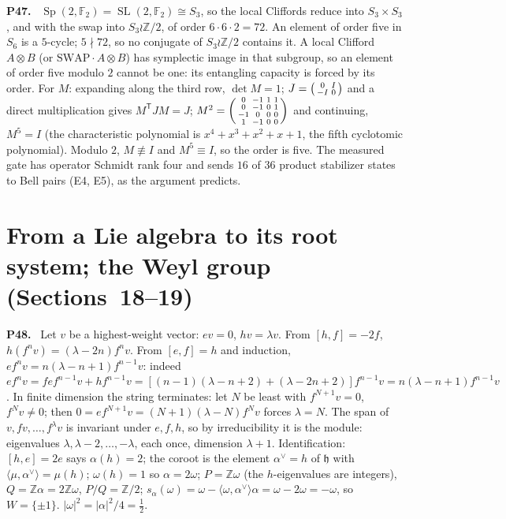 \documentclass[11pt]{article}
\newcommand{\Z}{\mathbb{Z}}
\newcommand{\SL}{\operatorname{SL}}
\newcommand{\Sp}{\operatorname{Sp}}
\newenvironment{solution}[1]{\medskip\noindent\textbf{P#1.}\ }{\par\medskip}
\begin{document}
\begin{solution}{47}
$\Sp(2,\mathbb F_2) = \SL(2,\mathbb F_2)\cong S_3$, so the local Cliffords reduce
into $S_3\times S_3$, and with the swap into $S_3\wr\Z/2$, of order
$6\cdot6\cdot2 = 72$. An element of order five in $S_6$ is a $5$-cycle; $5\nmid72$,
so no conjugate of $S_3\wr\Z/2$ contains it. A local Clifford $A\otimes B$ (or
$\mathrm{SWAP}\cdot A\otimes B$) has symplectic image in that subgroup, so an
element of order five modulo $2$ cannot be one: its entangling capacity is
forced by its order. For $M$: expanding along the third row,
$\det M = 1$; $J = \begin{psmallmatrix}0&I\\-I&0\end{psmallmatrix}$ and a direct
multiplication gives $M^{\mathsf T}JM = J$; $M^2 = \begin{psmallmatrix}0&-1&1&1\\0&-1&0&1\\-1&0&0&0\\1&-1&0&0\end{psmallmatrix}$
and continuing, $M^5 = I$ (the characteristic polynomial is
$x^4+x^3+x^2+x+1$, the fifth cyclotomic polynomial). Modulo $2$, $M\not\equiv I$
and $M^5\equiv I$, so the order is five. The measured gate has operator
Schmidt rank four and sends $16$ of $36$ product stabilizer states to Bell
pairs (E4, E5), as the argument predicts.
\end{solution}

\section*{From a Lie algebra to its root system; the Weyl group (Sections~18--19)}

\begin{solution}{48}
Let $v$ be a highest-weight vector: $ev = 0$, $hv = \lambda v$. From
$[h,f] = -2f$, $h(f^nv) = (\lambda-2n)f^nv$. From $[e,f] = h$ and
induction, $ef^nv = n(\lambda-n+1)f^{n-1}v$: indeed
$ef^nv = fef^{n-1}v + hf^{n-1}v = [(n-1)(\lambda-n+2)+(\lambda-2n+2)]f^{n-1}v
= n(\lambda-n+1)f^{n-1}v$. In finite dimension the string terminates: let
$N$ be least with $f^{N+1}v = 0$, $f^Nv\ne0$; then
$0 = ef^{N+1}v = (N+1)(\lambda-N)f^Nv$ forces $\lambda = N$. The span of
$v,fv,\dots,f^\lambda v$ is invariant under $e,f,h$, so by irreducibility it
is the module: eigenvalues $\lambda,\lambda-2,\dots,-\lambda$, each once,
dimension $\lambda+1$. Identification: $[h,e] = 2e$ says $\alpha(h) = 2$;
the coroot is the element $\alpha^\vee = h$ of $\mathfrak h$ with
$\langle\mu,\alpha^\vee\rangle = \mu(h)$; $\omega(h) = 1$ so
$\alpha = 2\omega$; $P = \Z\omega$ (the $h$-eigenvalues are integers),
$Q = \Z\alpha = 2\Z\omega$, $P/Q = \Z/2$; $s_\alpha(\omega) = \omega-\langle\omega,\alpha^\vee\rangle\alpha = \omega-2\omega = -\omega$,
so $W = \{\pm1\}$. $|\omega|^2 = |\alpha|^2/4 = \tfrac12$.
\end{solution}
\end{document}
